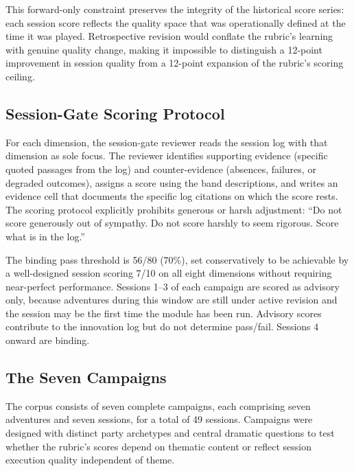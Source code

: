 This forward-only constraint preserves the integrity of the historical score series:
each session score reflects the quality space that was operationally defined at the
time it was played. Retrospective revision would conflate the rubric's learning with
genuine quality change, making it impossible to distinguish a 12-point improvement
in session quality from a 12-point expansion of the rubric's scoring ceiling.

\subsection{Session-Gate Scoring Protocol}
\label{sec:scoring-protocol}

For each dimension, the session-gate reviewer reads the session log with that
dimension as sole focus. The reviewer identifies supporting evidence (specific quoted
passages from the log) and counter-evidence (absences, failures, or degraded outcomes),
assigns a score using the band descriptions, and writes an evidence cell that documents
the specific log citations on which the score rests. The scoring protocol explicitly
prohibits generous or harsh adjustment: ``Do not score generously out of sympathy. Do
not score harshly to seem rigorous. Score what is in the log.''

The binding pass threshold is 56/80 (70\%), set conservatively to be achievable by a
well-designed session scoring 7/10 on all eight dimensions without requiring
near-perfect performance. Sessions 1--3 of each campaign are scored as advisory only,
because adventures during this window are still under active revision and the session
may be the first time the module has been run. Advisory scores contribute to the
innovation log but do not determine pass/fail. Sessions 4 onward are binding.

\subsection{The Seven Campaigns}

The corpus consists of seven complete campaigns, each comprising seven adventures and
seven sessions, for a total of 49 sessions. Campaigns were designed with distinct
party archetypes and central dramatic questions to test whether the rubric's scores
depend on thematic content or reflect session execution quality independent of theme.

